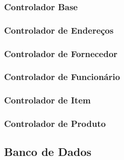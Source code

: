 \subsubsection{Controlador Base}

\subsubsection{Controlador de Endereços}

\subsubsection{Controlador de Fornecedor}

\subsubsection{Controlador de Funcionário}

\subsubsection{Controlador de Item}

\subsubsection{Controlador de Produto}


\subsection{Banco de Dados}


